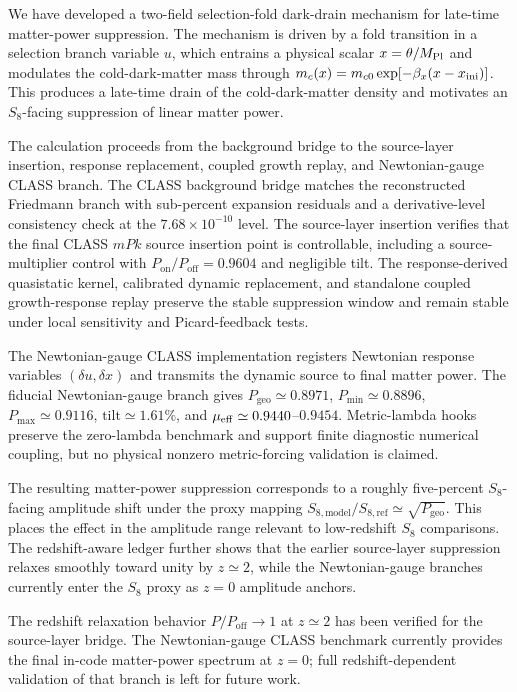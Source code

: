 ﻿\documentclass[11pt,prd,preprint,nofootinbib,amsmath,amssymb]{revtex4-2}
\begin{document}
We have developed a two-field selection-fold dark-drain mechanism for
late-time matter-power suppression. The mechanism is driven by a fold
transition in a selection branch variable $u$, which entrains a physical scalar
$x=\theta/M_{\rm Pl}$ and modulates the cold-dark-matter mass through
$m_c(x)=m_{c0}\exp[-\beta_x(x-x_{\rm ini})]$. This produces a late-time drain
of the cold-dark-matter density and motivates an $S_8$-facing suppression of
linear matter power.

The calculation proceeds from the background bridge to the source-layer
insertion, response replacement, coupled growth replay, and Newtonian-gauge
CLASS branch. The CLASS background bridge matches the reconstructed Friedmann
branch with sub-percent expansion residuals and a derivative-level consistency
check at the $7.68\times10^{-10}$ level. The source-layer insertion verifies
that the final CLASS $mPk$ source insertion point is controllable, including a
source-multiplier control with $P_{\mathrm{on}}/P_{\mathrm{off}}=0.9604$ and
negligible tilt. The response-derived quasistatic kernel, calibrated dynamic
replacement, and standalone coupled growth-response replay preserve the stable
suppression window and remain stable under local sensitivity and
Picard-feedback tests.

The Newtonian-gauge CLASS implementation registers Newtonian response variables
$(\delta u,\delta x)$ and transmits the dynamic source to final matter power.
The fiducial Newtonian-gauge branch gives
$P_{\mathrm{geo}}\simeq0.8971$,
$P_{\min}\simeq0.8896$, $P_{\max}\simeq0.9116$,
$\mathrm{tilt}\simeq1.61\%$, and
$\mu_{\rm eff}\simeq0.9440$--$0.9454$. Metric-lambda hooks preserve the
zero-lambda benchmark and support finite diagnostic numerical coupling, but no physical
nonzero metric-forcing validation is claimed.

The resulting matter-power suppression corresponds to a roughly five-percent
$S_8$-facing amplitude shift under the proxy mapping
$S_{8,\mathrm{model}}/S_{8,\mathrm{ref}}\simeq\sqrt{P_{\mathrm{geo}}}$. This places the
effect in the amplitude range relevant to low-redshift $S_8$ comparisons. The redshift-aware
ledger further shows that the earlier source-layer suppression relaxes smoothly
toward unity by $z\simeq2$, while the Newtonian-gauge branches currently
enter the $S_8$ proxy as $z=0$ amplitude anchors.

The redshift relaxation behavior $P/P_{\mathrm{off}}\to1$ at $z\simeq2$ has
been verified for the source-layer bridge. The Newtonian-gauge CLASS benchmark
currently provides the final in-code matter-power spectrum at $z=0$; full
redshift-dependent validation of that branch is left for future work.
\end{document}
